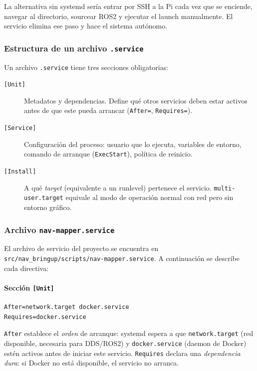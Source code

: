 La alternativa sin systemd sería entrar por SSH a la Pi cada vez que
se enciende, navegar al directorio, sourcear ROS2 y ejecutar el launch
manualmente. El servicio elimina ese paso y hace el sistema autónomo.

\subsubsection{Estructura de un archivo \texttt{.service}}

Un archivo \texttt{.service} tiene tres secciones obligatorias:

\begin{description}
  \item[\texttt{[Unit]}] Metadatos y dependencias. Define qué otros
    servicios deben estar activos antes de que este pueda arrancar
    (\texttt{After=}, \texttt{Requires=}).
  \item[\texttt{[Service]}] Configuración del proceso: usuario que lo ejecuta,
    variables de entorno, comando de arranque (\texttt{ExecStart}),
    política de reinicio.
  \item[\texttt{[Install]}] A qué \emph{target} (equivalente a un runlevel)
    pertenece el servicio. \texttt{multi-user.target} equivale al modo
    de operación normal con red pero sin entorno gráfico.
\end{description}

\subsubsection{Archivo \texttt{nav-mapper.service}}

El archivo de servicio del proyecto se encuentra en
\texttt{src/nav\_bringup/scripts/nav-mapper.service}. A continuación se
describe cada directiva:

\paragraph{Sección \texttt{[Unit]}}

\begin{verbatim}
After=network.target docker.service
Requires=docker.service
\end{verbatim}

\texttt{After} establece el \emph{orden} de arranque: systemd espera a que
\texttt{network.target} (red disponible, necesaria para DDS/ROS2) y
\texttt{docker.service} (daemon de Docker) estén activos antes de iniciar
este servicio. \texttt{Requires} declara una \emph{dependencia dura}: si
Docker no está disponible, el servicio no arranca.

